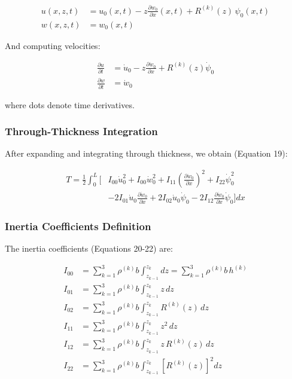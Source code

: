 \documentclass[12pt,a4paper]{article}
\begin{document}
\begin{align}
u(x,z,t) &= u_0(x,t) - z \frac{\partial w_0}{\partial x}(x,t)
           + R^{(k)}(z) \, \psi_0(x,t) \\[6pt]
w(x,z,t) &= w_0(x,t)
\end{align}

And computing velocities:

\begin{align}
\frac{\partial u}{\partial t} &= \dot{u}_0 - z \frac{\partial \dot{w}_0}{\partial x} + R^{(k)}(z) \dot{\psi}_0 \\
\frac{\partial w}{\partial t} &= \dot{w}_0
\end{align}

where dots denote time derivatives.

\subsubsection{Through-Thickness Integration}

After expanding and integrating through thickness, we obtain (Equation 19):

\begin{align}
T = \frac{1}{2} \int_0^L \Big[ & I_{00}\dot{u}_0^2 + I_{00}\dot{w}_0^2
+ I_{11}\left(\frac{\partial \dot{w}_0}{\partial x}\right)^2 + I_{22}\dot{\psi}_0^2 \nonumber \\
& - 2I_{01}\dot{u}_0\frac{\partial \dot{w}_0}{\partial x}
+ 2I_{02}\dot{u}_0\dot{\psi}_0
- 2I_{12}\frac{\partial \dot{w}_0}{\partial x}\dot{\psi}_0 \Big] dx
\end{align}

\subsubsection{Inertia Coefficients Definition}

The inertia coefficients (Equations 20-22) are:

\begin{align}
I_{00} &= \sum_{k=1}^{3} \rho^{(k)} b \int_{z_{k-1}}^{z_k} dz
       = \sum_{k=1}^{3} \rho^{(k)} b \, h^{(k)} \\[6pt]
I_{01} &= \sum_{k=1}^{3} \rho^{(k)} b \int_{z_{k-1}}^{z_k} z \, dz \\[6pt]
I_{02} &= \sum_{k=1}^{3} \rho^{(k)} b \int_{z_{k-1}}^{z_k} R^{(k)}(z) \, dz \\[6pt]
I_{11} &= \sum_{k=1}^{3} \rho^{(k)} b \int_{z_{k-1}}^{z_k} z^2 \, dz \\[6pt]
I_{12} &= \sum_{k=1}^{3} \rho^{(k)} b \int_{z_{k-1}}^{z_k} z \, R^{(k)}(z) \, dz \\[6pt]
I_{22} &= \sum_{k=1}^{3} \rho^{(k)} b \int_{z_{k-1}}^{z_k} \left[ R^{(k)}(z) \right]^2 dz
\end{align}
\end{document}
